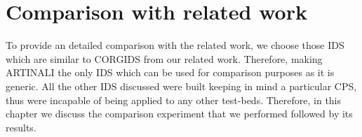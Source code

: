 
\chapter{Comparison with related work}
\label{ch:comparisonwithrelatedwork}

To provide an detailed comparison with the related work, we choose those \ac{IDS} which are similar to \ac{CORGIDS} from our related work. Therefore, making ARTINALI the only \ac{IDS} which can be used for comparison purposes as it is generic. All the other \ac{IDS} discussed were built keeping in mind a particular \ac{CPS}, thus were incapable of being applied to any other test-beds. Therefore, in this chapter we discuss the comparison experiment that we performed followed by its results.

